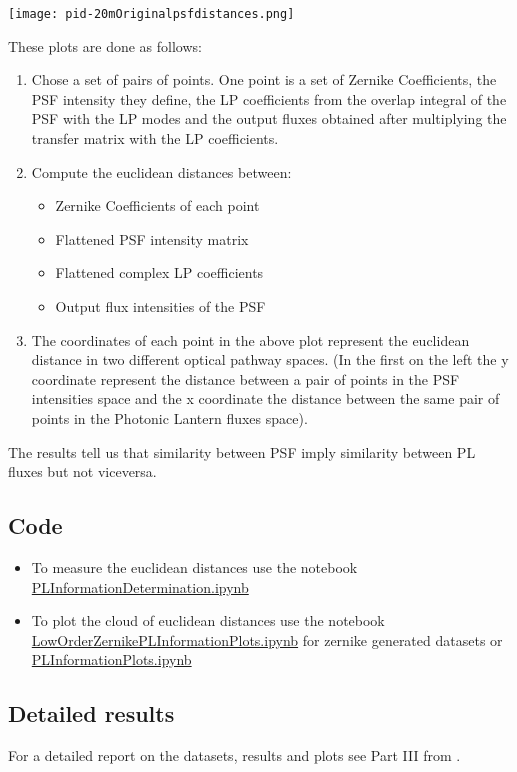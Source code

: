 		\begin{figure*}[ht!]
			\centering
			\texttt{[image: pid-20mOriginalpsfdistances.png]}
		\end{figure*}
		\FloatBarrier
		
		These plots are done as follows:
		\begin{enumerate}
			\item Chose a set of pairs of points. One point is a set of Zernike Coefficients, the PSF intensity they define, the LP coefficients from the overlap integral of the PSF with the LP modes and the output fluxes obtained after multiplying the transfer matrix with the LP coefficients.
			\item Compute the euclidean distances between:
				\begin{itemize}
					\item Zernike Coefficients of each point
					\item Flattened PSF intensity matrix
					\item Flattened complex LP coefficients
					\item Output flux intensities of the PSF
				\end{itemize}
			\item The coordinates of each point in the above plot represent the euclidean distance in two different optical pathway spaces. (In the first on the left the y coordinate represent the distance between a pair of points in the PSF intensities space and the x coordinate the distance between the same pair of points in the Photonic Lantern fluxes space).
		\end{enumerate}
		
		The results tell us that similarity between PSF imply similarity between PL fluxes but not viceversa.
		
	\subsection{Code}
		\begin{itemize}
			\item To measure the euclidean distances use the notebook \href{https://github.com/Dacarpe03/PLImageReconstruction/blob/main/PSFReconstruction/DataNotebooks/PLInformationDetermination.ipynb}{PLInformationDetermination.ipynb}
			\item To plot the cloud of euclidean distances use the notebook \href{https://github.com/Dacarpe03/PLImageReconstruction/blob/main/PSFReconstruction/Plots/LowOrderZernikePLInformationPlots.ipynb}{LowOrderZernikePLInformationPlots.ipynb} for zernike generated datasets or \href{https://github.com/Dacarpe03/PLImageReconstruction/blob/main/PSFReconstruction/Plots/PLInformationPlots.ipynb}{PLInformationPlots.ipynb}
		\end{itemize}
		
	\subsection{Detailed results}
	
		For a detailed report on the datasets, results and plots see Part III from .
		
